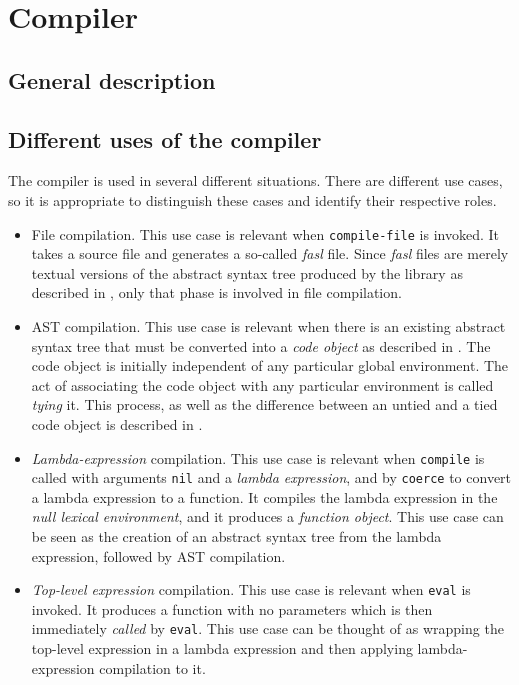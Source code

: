 \chapter{Compiler}
\label{chap-compiler}

\section{General description}

\section{Different uses of the compiler}

The compiler is used in several different situations.  There are
different use cases, so it is appropriate to distinguish these cases
and identify their respective roles.

\begin{itemize}
\item File compilation.  This use case is relevant when
  \texttt{compile-file} is invoked.  It takes a \commonlisp{} source
  file and generates a so-called \emph{fasl} file.  Since \sysname{}
  \emph{fasl} files are merely textual versions of the abstract syntax
  tree produced by the \iconoclast{} library as described in
  , only that phase is involved in file
  compilation.

\item AST compilation.  This use case is relevant when there is an
  existing abstract syntax tree that must be converted into a
  \emph{code object} as described in
  .  The code object is
  initially independent of any particular global environment.  The act
  of associating the code object with any particular environment is
  called \emph{tying} it.  This process, as well as the difference
  between an untied and a tied code object is described in
  .

\item \emph{Lambda-expression} compilation.  This use case is relevant
  when \texttt{compile} is called with arguments \texttt{nil} and a
  \emph{lambda expression}, and by \texttt{coerce} to convert a lambda
  expression to a function.  It compiles the lambda expression in the
  \emph{null lexical environment}, and it produces a \emph{function
    object}.  This use case can be seen as the creation of an abstract
  syntax tree from the lambda expression, followed by AST compilation.

\item \emph{Top-level expression} compilation.  This use case is
  relevant when \texttt{eval} is invoked.  It produces a function with
  no parameters which is then immediately \emph{called} by
  \texttt{eval}.  This use case can be thought of as wrapping the
  top-level expression in a lambda expression and then applying
  lambda-expression compilation to it.

\end{itemize}

